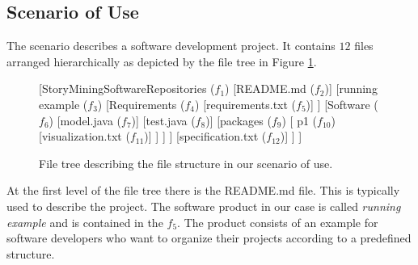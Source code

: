 \subsection{Scenario of Use}
\label{subsec:scenario}

The scenario describes a software development project. It contains $12$ files arranged hierarchically as depicted by the file tree in Figure \ref{fig_fileTreeExample}. 

\begin{figure}
	\centering
	\scriptsize{
	\begin{forest}
		[StoryMiningSoftwareRepositories ($f_1$)
			[README.md ($f_2$)]
			[running example ($f_3$)
				[Requirements ($f_4$)
					[requirements.txt ($f_5$)]
				]
				[Software ($f_6$)
					[model.java ($f_7$)]
					[test.java ($f_8$)]
					[packages ($f_9$) [
						p1 ($f_{10}$)
							[visualization.txt ($f_{11}$)] 
						]
					]
				]
				[specification.txt ($f_{12}$)]
			]
		]
	\end{forest}
	}
	\caption{File tree describing the file structure in our scenario of use.}
	\label{fig_fileTreeExample}
\end{figure}

At the first level of the file tree there is the README.md file. This is typically used to describe the project. The software product in our case is called \emph{running example} and is contained in the $f_5$. The product consists of an example for software developers who want to organize their projects according to a predefined structure. 

%
%

